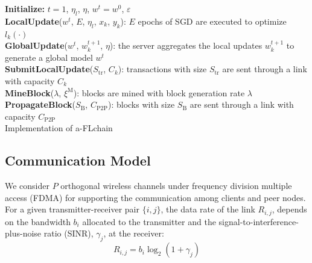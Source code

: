 \documentclass[10pt,journal,compsoc]{IEEEtran}
\begin{document}
\begin{algorithm}[ht!]	
	\SetAlgoLined
	\textbf{Initialize:} $t=1$, $\eta_l$, $\eta$, $w^t = w^0$, $\varepsilon$\\
	\textbf{LocalUpdate}($w^t$, $E$, $\eta_l$, $x_k$, $y_k$): $E$ epochs of SGD are executed to optimize $l_k(\cdot)$\\
	\textbf{GlobalUpdate}($w^t$, $w_k^{t+1}$, $\eta$): the server aggregates the local updates $w_k^{t+1}$ to generate a global model $w^t$ \\
	\textbf{SubmitLocalUpdate}($S_\text{tr}$, $C^{}_k$): transactions with size $S_\text{tr}$ are sent through a link with capacity $C^{}_k$\\
	\textbf{MineBlock}($\lambda$, $\xi^\text{M}$): blocks are mined with block generation rate $\lambda$\\
	\textbf{PropagateBlock}($S_\text{B}$, $C_\text{P2P}$): blocks with size $S_\text{B}$ are sent through a link with capacity $C_\text{P2P}$\\  
	\caption{Implementation of a-FLchain}
	\label{alg:aflchain}			
\end{algorithm}

\subsection{Communication Model}
\label{section:comm_model}
We consider $P$ orthogonal wireless channels under frequency division multiple access (FDMA) for supporting the communication among clients and peer nodes. For a given transmitter-receiver pair $\{i,j\}$, the data rate of the link $R_{i,j}$, depends on the bandwidth $b_{i}$ allocated to the transmitter and the signal-to-interference-plus-noise ratio (SINR), $\gamma_{j}$, at the receiver:   
\begin{equation}
R_{i,j} = b_i \log_2(1 + \gamma_j)
\end{equation}
\end{document}
